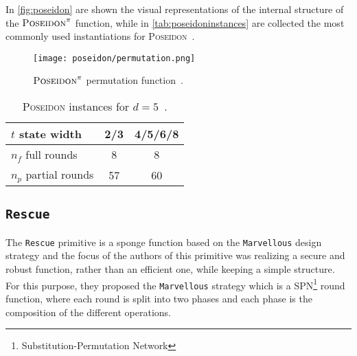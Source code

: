 \documentclass[12pt, a4paper]{report}
\begin{document}
In \autoref{fig:poseidon} are shown the visual representations of the internal structure of the $\textsc{Poseidon}^\pi$ function, while in \autoref{tab:poseidoninstances} are collected the most commonly used instantiations for \textsc{Poseidon}~\cite[Tab.2]{poseidon}.

\begin{figure}[H]
  \begin{center}
      \texttt{[image: poseidon/permutation.png]}
  \end{center}
  \caption{$\textsc{Poseidon}^\pi$ permutation function~\cite[Fig.~2]{poseidon}.}\label{fig:poseidon}
\end{figure}

\begin{table}[H]
  \caption{\textsc{Poseidon} instances for $d=5$~\cite[Tab.~2]{poseidon}.}\label{tab:poseidoninstances}
  \begin{center}
    \begin{tabular}{|l|c|c|}
      \hline
      $t$ state width & 2/3 & 4/5/6/8 \\
      \hline
      $n_f$ full rounds & 8 & 8 \\
      \hline
      $n_p$ partial rounds & 57 & 60 \\
      \hline
    \end{tabular}
  \end{center}
\end{table}

\subsection{\texttt{Rescue}}\label{subsec:rescue}

The \texttt{Rescue} primitive is a sponge function based on the \texttt{Marvellous} design strategy and the focus of the authors of this primitive was realizing a secure and robust function, rather than an efficient one, while keeping a simple structure.
For this purpose, they proposed the \texttt{Marvellous} strategy which is a SPN\footnote{Substitution-Permutation Network} round function, where each round is split into two phases and each phase is the composition of the different operations.
\end{document}
